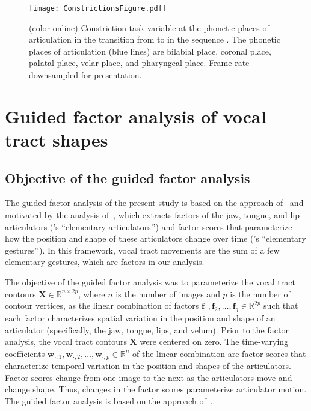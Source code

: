 \documentclass[preprint]{JASAnew}\usepackage[]{graphicx}\usepackage[]{color}
\begin{document}
\begin{figure}

\texttt{[image: ConstrictionsFigure.pdf]}

\caption{(color online) Constriction task variable at the phonetic places of articulation in the transition from \textipa{[A]} to \textipa{[i]} in the sequence \textipa{[AiA]}. The phonetic places of articulation (blue lines) are bilabial place, coronal place, palatal place, velar place, and pharyngeal place. Frame rate downsampled for presentation.}
\label{fig:constrictions}
\end{figure}




\section{Guided factor analysis of vocal tract shapes}
\label{sec:gfa}




\subsection{Objective of the guided factor analysis}
\label{subsec:objectivesoftheguidedfactoranalysis}

The guided factor analysis of the present study is based on the approach of~\citet{toutios2015factor} and motivated by the analysis of~\citet{maeda1990compensatory}, which extracts factors of the jaw, tongue, and lip articulators (\citeauthor{maeda1990compensatory}’s ``elementary articulators’’) and factor scores that parameterize how the position and shape of these articulators change over time (\citeauthor{maeda1990compensatory}’s ``elementary gestures’’). In this framework, vocal tract movements are the sum of a few elementary gestures, which are factors in our analysis. 

The objective of the guided factor analysis was to parameterize the vocal tract contours $\mathbf{X} \in \mathbb{R}^{n\times 2p}$, where $n$ is the number of images and $p$ is the number of contour vertices, as the linear combination of factors $\mathbf{f}_1, \mathbf{f}_2, \ldots, \mathbf{f}_q \in \mathbb{R}^{2p}$ such that each factor characterizes spatial variation in the position and shape of an articulator (specifically, the jaw, tongue, lips, and velum). 
%
Prior to the factor analysis, the vocal tract contours $\mathbf{X}$ were centered on zero.
%
The time-varying coefficients $\mathbf{w}_{\cdot,1},\mathbf{w}_{\cdot,2},\ldots,\mathbf{w}_{\cdot,p} \in \mathbb{R}^n$ of the linear combination are factor scores that characterize temporal variation in the position and shapes of the articulators. Factor scores change from one image to the next as the articulators move and change shape. Thus, changes in the factor scores parameterize articulator motion.
%
The guided factor analysis is based on the approach of~\citet{toutios2015factor}.
\end{document}
